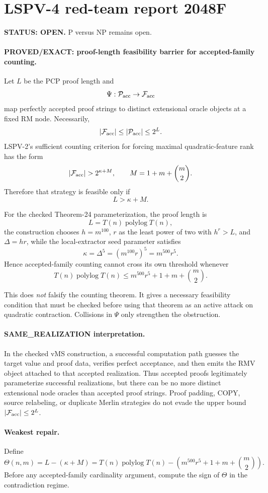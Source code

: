 \documentclass[11pt]{article}
\begin{document}
\section*{LSPV-4 red-team report 2048F}
\textbf{STATUS: OPEN.} P versus NP remains open.

\paragraph{PROVED/EXACT: proof-length feasibility barrier for accepted-family counting.}
Let $L$ be the PCP proof length and
\[
\Psi:\mathcal P_{\rm acc}\to\mathcal F_{\rm acc}
\]
map perfectly accepted proof strings to distinct extensional oracle objects at a fixed RM node. Necessarily,
\[
|\mathcal F_{\rm acc}|\le |\mathcal P_{\rm acc}|\le 2^L.
\]
LSPV-2's sufficient counting criterion for forcing maximal quadratic-feature rank has the form
\[
|\mathcal F_{\rm acc}|>2^{\kappa+M},
\qquad
M=1+m+\binom m2.
\]
Therefore that strategy is feasible only if
\[
\boxed{L>\kappa+M.}
\]

For the checked Theorem-24 parameterization, the proof length is
\[
L=T(n)\operatorname{polylog}T(n),
\]
the construction chooses $h=m^{100}$, $r$ as the least power of two with $h^r>L$, and $\Delta=hr$, while the local-extractor seed parameter satisfies
\[
\kappa=\Delta^5=(m^{100}r)^5=m^{500}r^5.
\]
Hence accepted-family counting cannot cross its own threshold whenever
\[
\boxed{
T(n)\operatorname{polylog}T(n)
\le
m^{500}r^5+1+m+\binom m2.
}
\]

This does \emph{not} falsify the counting theorem. It gives a necessary feasibility condition that must be checked before using that theorem as an active attack on quadratic contraction. Collisions in $\Psi$ only strengthen the obstruction.

\paragraph{SAME\_REALIZATION interpretation.}
In the checked vMS construction, a successful computation path guesses the target value and proof data, verifies perfect acceptance, and then emits the RMV object attached to that accepted realization. Thus accepted proofs legitimately parameterize successful realizations, but there can be no more distinct extensional node oracles than accepted proof strings. Proof padding, COPY, source relabeling, or duplicate Merlin strategies do not evade the upper bound $|\mathcal F_{\rm acc}|\le 2^L$.

\paragraph{Weakest repair.}
Define
\[
\Theta(n,m)
=
L-(\kappa+M)
=
T(n)\operatorname{polylog}T(n)
-
\left(
m^{500}r^5+1+m+\binom m2
\right).
\]
Before any accepted-family cardinality argument, compute the sign of $\Theta$ in the contradiction regime.
\end{document}

